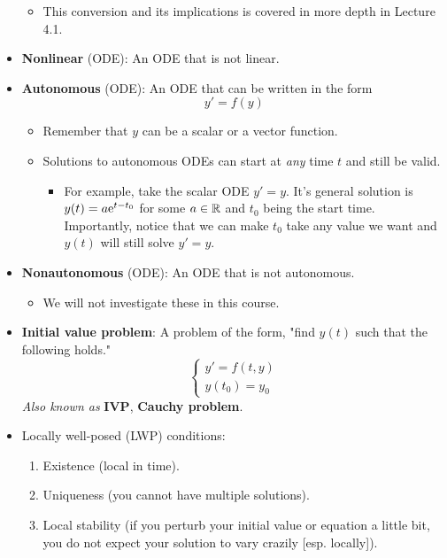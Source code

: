 \documentclass[../notes.tex]{subfiles}
\begin{document}
\begin{itemize}
\begin{itemize}
        \item This conversion and its implications is covered in more depth in Lecture 4.1.
    \end{itemize}
    \item \textbf{Nonlinear} (ODE): An ODE that is not linear.
    \item \textbf{Autonomous} (ODE): An ODE that can be written in the form
    \begin{equation*}
        y' = f(y)
    \end{equation*}
    \begin{itemize}
        \item Remember that $y$ can be a scalar or a vector function.
        \item Solutions to autonomous ODEs can start at \emph{any} time $t$ and still be valid.
        \begin{itemize}
            \item For example, take the scalar ODE $y'=y$. It's general solution is $y(t)=a\e[t-t_0]$ for some $a\in\R$ and $t_0$ being the start time. Importantly, notice that we can make $t_0$ take any value we want and $y(t)$ will still solve $y'=y$.
        \end{itemize}
    \end{itemize}
    \item \textbf{Nonautonomous} (ODE): An ODE that is not autonomous.
    \begin{itemize}
        \item We will not investigate these in this course.
    \end{itemize}
    \item \textbf{Initial value problem}: A problem of the form, "find $y(t)$ such that the following holds."
    \begin{equation*}
        \begin{cases}
            y' = f(t,y)\\
            y(t_0) = y_0
        \end{cases}
    \end{equation*}
    \emph{Also known as} \textbf{IVP}, \textbf{Cauchy problem}.
    \item Locally well-posed (LWP) conditions:
    \begin{enumerate}
        \item Existence (local in time).
        \item Uniqueness (you cannot have multiple solutions).
        \item Local stability (if you perturb your initial value or equation a little bit, you do not expect your solution to vary crazily [esp. locally]).

\end{enumerate}
\end{itemize}
\end{document}
